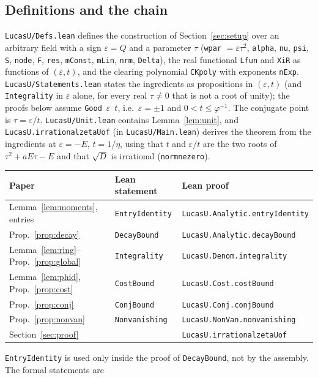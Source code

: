 \documentclass[11pt]{amsart}
\theoremstyle{definition}
\theoremstyle{remark}
\numberwithin{equation}{section}
\newcommand{\lean}[1]{{\def\_{\textunderscore\allowbreak}\texttt{#1}}}
\begin{document}
\subsection*{Definitions and the chain}
\lean{LucasU/Defs.lean} defines the construction of Section~\ref{sec:setup} over an arbitrary field with a sign
$\varepsilon=Q$ and a parameter $\tau$ (\lean{wpar} $=\varepsilon\tau^2$, \lean{alpha}, \lean{nu}, \lean{psi}, \lean{S},
\lean{node}, \lean{F}, \lean{res}, \lean{mConst}, \lean{mLin}, \lean{nrm}, \lean{Delta}), the real functional \lean{Lfun}
and \lean{XiR} as functions of $(\varepsilon,t)$, and the clearing polynomial \lean{CKpoly} with exponents \lean{nExp}.
\lean{LucasU/Statements.lean} states the ingredients as propositions in $(\varepsilon,t)$ (and \lean{Integrality} in
$\varepsilon$ alone, for every real $\tau\ne0$ that is not a root of unity); the proofs below assume
\lean{Good}~$\varepsilon$~$t$, i.e.\ $\varepsilon=\pm1$ and $0<t\le\varphi^{-1}$. The conjugate point is
$\tau=\varepsilon/t$. \lean{LucasU/Unit.lean} contains
Lemma~\ref{lem:unit}, and \lean{LucasU.irrational\_zetaU\_of} (in \lean{LucasU/Main.lean}) derives the theorem from the
ingredients at $\varepsilon=-E$, $t=1/\eta$, using that $t$ and $\varepsilon/t$ are the two roots of
$\tau^2+aE\tau-E$ and that $\sqrt D$ is irrational (\lean{norm\_ne\_zero}).
\begin{center}
\small
\begin{tabular}{lll}
\toprule
Paper & Lean statement & Lean proof\\
\midrule
Lemma~\ref{lem:moments}, entries & \lean{EntryIdentity} & \lean{LucasU.Analytic.entryIdentity}\\
Prop.~\ref{prop:decay} & \lean{DecayBound} & \lean{LucasU.Analytic.decayBound}\\
Lemma~\ref{lem:ring}--Prop.~\ref{prop:global} & \lean{Integrality} & \lean{LucasU.Denom.integrality}\\
Lemma~\ref{lem:phid}, Prop.~\ref{prop:cost} & \lean{CostBound} & \lean{LucasU.Cost.costBound}\\
Prop.~\ref{prop:conj} & \lean{ConjBound} & \lean{LucasU.Conj.conjBound}\\
Prop.~\ref{prop:nonvan} & \lean{Nonvanishing} & \lean{LucasU.NonVan.nonvanishing}\\
Section~\ref{sec:proof} & & \lean{LucasU.irrational\_zetaU\_of}\\
\bottomrule
\end{tabular}
\end{center}
\lean{EntryIdentity} is used only inside the proof of \lean{DecayBound}, not by the assembly. The formal statements are
\end{document}
